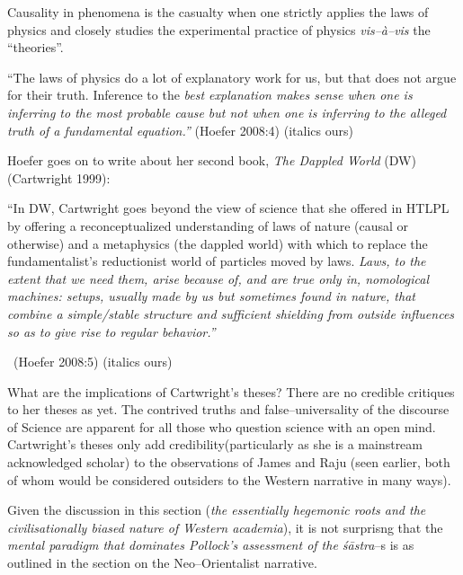 \vskip 2pt

Causality in phenomena is the casualty when one strictly applies the laws of physics and closely studies the experimental practice of physics \textit{vis–à–vis} the “theories”.

\vskip 2pt

\begin{myquote}
“The laws of physics do a lot of explanatory work for us, but that does not argue for their truth. Inference to the \textit{best explanation makes sense when one is inferring to the most probable cause but not when one is inferring to the alleged truth of a fundamental equation.”} \hfill (Hoefer 2008:4) (italics ours)
\end{myquote}

\vskip 2pt

Hoefer goes on to write about her second book, \textit{The Dappled World} (DW)(Cartwright 1999):

\vskip 2pt

\begin{myquote}
“In DW, Cartwright goes beyond the view of science that she offered in HTLPL by offering a reconceptualized understanding of laws of nature (causal or otherwise) and a metaphysics (the dappled world) with which to replace the fundamentalist’s reductionist world of particles moved by laws. \textit{Laws, to the extent that we need them, arise because of, and are true only in, nomological machines: setups, usually made by us but sometimes found in nature, that combine a simple/stable structure and sufficient shielding from outside influences so as to give rise to regular behavior.”} 

~\hfill (Hoefer 2008:5) (italics ours)
\end{myquote}

What are the implications of Cartwright’s theses? There are no credible critiques to her theses as yet. The contrived truths and false–universality of the discourse of Science are apparent for all those who question science with an open mind. Cartwright’s theses only add credibility(particularly as she is a mainstream acknowledged scholar) to the observations of James and Raju (seen earlier, both of whom would be considered outsiders to the Western narrative in many ways).

Given the discussion in this section (\textit{the essentially hegemonic roots and the civilisationally biased nature of Western academia}), it is not surprisng that the \textit{mental paradigm that dominates Pollock’s assessment of the śāstra}–s is as outlined in the section on the Neo–Orientalist narrative.



